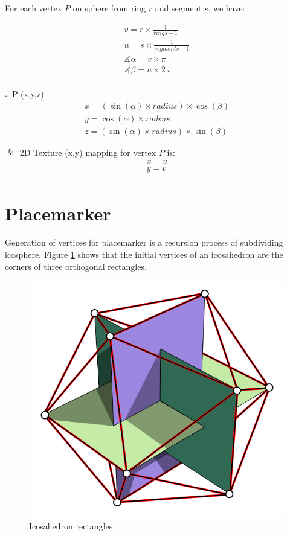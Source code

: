 For each vertex $P$ on sphere from ring $r$ and segment $s$, we have:

\[
\begin{array}{lr}
v = r \times  \frac{1}{rings - 1} \\
u = s \times  \frac{1}{segments - 1} \\
\measuredangle \alpha = v \times \pi \\
\measuredangle \beta = u \times 2\,\pi \\
\end{array}
\]

$\therefore$ P (x,\;y,\;z)
\[
\begin{array}{lr}
x = (\sin(\alpha) \times radius) \times \cos(\beta) \\
y = \cos(\alpha) \times radius \\
z =  (\sin(\alpha) \times radius) \times \sin(\beta)
\end{array}
\]

$\And$ 2D Texture (x,\;y) mapping for vertex $P$ is:
\[
\begin{array}{lr}
x = u \\
y = v \\
\end{array}
\]

\section{Placemarker}

Generation of vertices for placemarker is a recursion process of subdividing icosphere. Figure \ref{fig:icosahedron-rectangles} shows that the initial vertices of an icosahedron are the corners of three orthogonal rectangles.

\begin{figure}[H]
\caption[icosahedron-rectangles]{Icosahedron rectangles \parencite{wiki.icosahedron-rectangles.2006}}
\label{fig:icosahedron-rectangles}
\centering
\includegraphics[width=\linewidth]{Figures/icosahedron-rectangles.png}
\decoRule
\end{figure}

